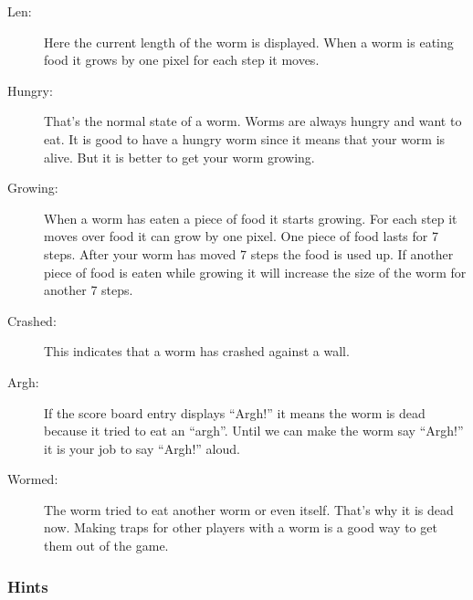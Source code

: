\begin{description}
\item[Len:]
Here the current length of the worm is displayed. When a worm is eating
food it grows by one pixel for each step it moves. 

\item[Hungry:]
That's the normal state of a worm. Worms are always
hungry and want to eat. It is good to have a hungry
worm since it means that your worm is alive. But it is
better to get your worm growing. 

\item[Growing:]
When a worm has eaten a piece of food it starts growing. For each step
it moves over food it can grow by one pixel. One piece of food lasts
for 7 steps. After your worm has moved 7 steps the food is used up. If
another piece of food is eaten while growing it will increase the size
of the worm for another 7 steps. 

\item[Crashed:]
This indicates that a worm has crashed against a wall.

\item[Argh:]
If the score board entry displays ``Argh!'' it
means the worm is dead because it tried to eat an ``argh''. Until we
can make the worm say ``Argh!'' it is your job to say ``Argh!'' aloud.

\item[Wormed:]
The worm tried to eat another worm or even itself.
That's why it is dead now.  Making traps for other players with a worm
is a good way to get them out of the game.
\end{description}

\subsubsection{Hints}

